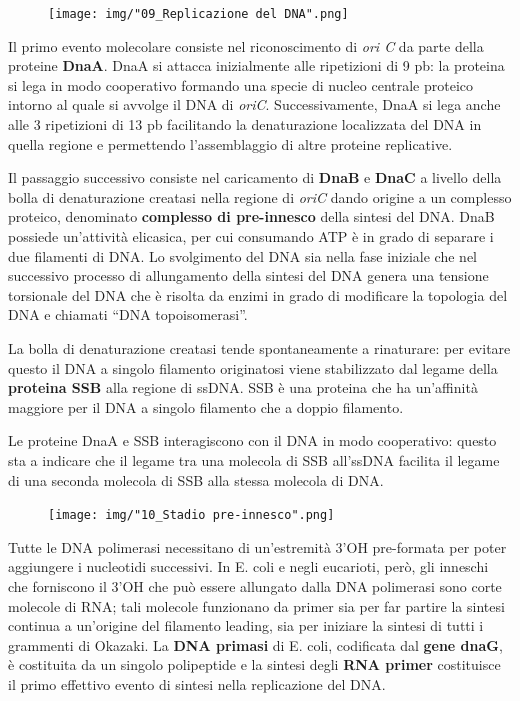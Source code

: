 \documentclass[11pt]{book}
\begin{document}
\begin{figure}[htp]
\centering
\texttt{[image: img/"09\_Replicazione del DNA".png]}
\caption{}
\label{replicazione-del-dna}
\end{figure}

Il primo evento molecolare consiste nel riconoscimento di \emph{ori C}
da parte della proteine \textbf{DnaA}. DnaA si attacca inizialmente alle
ripetizioni di 9 pb: la proteina si lega in modo cooperativo formando
una specie di nucleo centrale proteico intorno al quale si avvolge il
DNA di \emph{oriC}. Successivamente, DnaA si lega anche alle 3
ripetizioni di 13 pb facilitando la denaturazione localizzata del DNA in
quella regione e permettendo l'assemblaggio di altre proteine
replicative.

Il passaggio successivo consiste nel caricamento di \textbf{DnaB} e
\textbf{DnaC} a livello della bolla di denaturazione creatasi nella
regione di \emph{oriC} dando origine a un complesso proteico, denominato
\textbf{complesso di pre-innesco} della sintesi del DNA. DnaB possiede
un'attività elicasica, per cui consumando ATP è in grado di separare i
due filamenti di DNA. Lo svolgimento del DNA sia nella fase iniziale che
nel successivo processo di allungamento della sintesi del DNA genera una
tensione torsionale del DNA che è risolta da enzimi in grado di
modificare la topologia del DNA e chiamati ``DNA topoisomerasi''.

La bolla di denaturazione creatasi tende spontaneamente a rinaturare:
per evitare questo il DNA a singolo filamento originatosi viene
stabilizzato dal legame della \textbf{proteina SSB} alla regione di
ssDNA. SSB è una proteina che ha un'affinità maggiore per il DNA a
singolo filamento che a doppio filamento.

Le proteine DnaA e SSB interagiscono con il DNA in modo cooperativo:
questo sta a indicare che il legame tra una molecola di SSB all'ssDNA
facilita il legame di una seconda molecola di SSB alla stessa molecola
di DNA.

\clearpage

\begin{figure}[htp]
\centering
\texttt{[image: img/"10\_Stadio pre-innesco".png]}
\caption{}
\label{stadio-pre-innesco}
\end{figure}

Tutte le DNA polimerasi necessitano di un'estremità 3'OH pre-formata per
poter aggiungere i nucleotidi successivi. In E. coli e negli eucarioti,
però, gli inneschi che forniscono il 3'OH che può essere allungato dalla
DNA polimerasi sono corte molecole di RNA; tali molecole funzionano da
primer sia per far partire la sintesi continua a un'origine del
filamento leading, sia per iniziare la sintesi di tutti i grammenti di
Okazaki. La \textbf{DNA primasi} di E. coli, codificata dal \textbf{gene
dnaG}, è costituita da un singolo polipeptide e la sintesi degli
\textbf{RNA primer} costituisce il primo effettivo evento di sintesi
nella replicazione del DNA.
\end{document}
